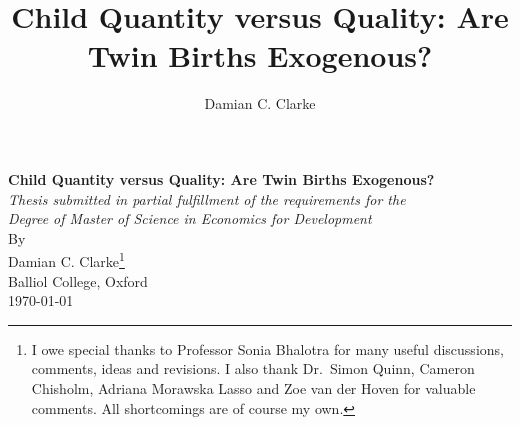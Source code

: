 \documentclass{article}[11pt,subeqn]
\title{Child Quantity versus Quality: Are Twin Births Exogenous?}
\author{Damian C. Clarke}
\begin{document}
\begin{spacing}{1.25}


\renewcommand{\thefootnote}{\fnsymbol{footnote}}

\begin{titlepage}
\begin{center} 
\textbf{\Large Child Quantity versus Quality: Are Twin Births Exogenous?}\\
\vspace{3cm}
\emph{Thesis submitted in partial fulfillment of the requirements for the\\
Degree of Master of Science in Economics for Development}\\ 
\vspace{0.2cm}
\vspace{3.5cm}
By\\
\vspace{2.5cm}
Damian C. Clarke\footnote{I owe special thanks to Professor Sonia Bhalotra for many useful discussions, comments, ideas and revisions.  I also thank Dr.\ 
Simon Quinn, Cameron Chisholm, Adriana Morawska Lasso and Zoe van der Hoven for valuable comments.  All shortcomings are of course my own.}\\
Balliol College, Oxford\\
\today\\
\vspace{5cm}
\vfill
\end{center}
\end{titlepage}

\setcounter{savefootnote}{\value{footnote}}%
\setcounter{footnote}{0}
\renewcommand{\thefootnote}{\arabic{footnote}}
\end{spacing}
\end{document}
